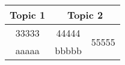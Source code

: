 \documentclass{article}
\begin{document}
\begin{table}[!h]
	\centering\renewcommand{}
	\begin{tabular}{c|c|c}
		\hline
		Topic 1 & \multicolumn{2}{c}{Topic 2}    \\
		\hline
		33333   & 44444 & \multirow{2}{*}{55555} \\
		\cline{1-2}
		aaaaa   & bbbbb                          \\
		\hline
	\end{tabular}
	\caption{}
	\label{table:example-app}
\end{table}
\end{document}
